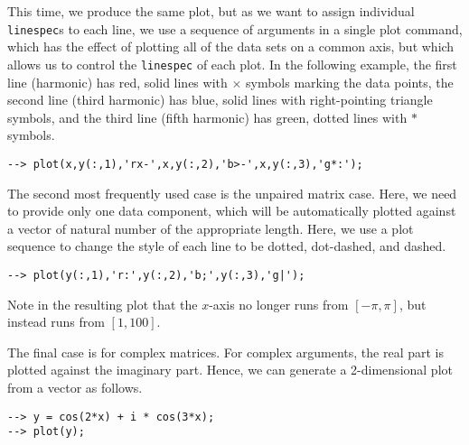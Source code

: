 
This time, we produce the same plot, but as we want to assign individual
\verb|linespec|s to each line, we use a sequence of arguments in a single plot
command, which has the effect of plotting all of the data sets on a common 
axis, but which allows us to control the \verb|linespec| of each plot. In 
the following example, the first line (harmonic) has red, solid lines with $\times$ symbols
marking the data points, the second line (third harmonic) has blue, solid lines
with right-pointing triangle symbols, and the third line (fifth harmonic) has
green, dotted lines with $*$ symbols.
\begin{verbatim}
--> plot(x,y(:,1),'rx-',x,y(:,2),'b>-',x,y(:,3),'g*:');
\end{verbatim}


The second most frequently used case is the unpaired matrix case.  Here, we need
to provide only one data component, which will be automatically plotted against
a vector of natural number of the appropriate length.  Here, we use a plot sequence
to change the style of each line to be dotted, dot-dashed, and dashed.
\begin{verbatim}
--> plot(y(:,1),'r:',y(:,2),'b;',y(:,3),'g|');
\end{verbatim}
Note in the resulting plot that the $x$-axis no longer runs from $[-\pi,\pi]$, but 
instead runs from $[1,100]$.


The final case is for complex matrices.  For complex arguments, the real part is
plotted against the imaginary part.  Hence, we can generate a 2-dimensional plot
from a vector as follows.
\begin{verbatim}
--> y = cos(2*x) + i * cos(3*x);
--> plot(y);
\end{verbatim}


